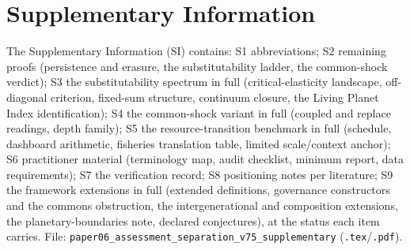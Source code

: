 \section*{Supplementary Information}
The Supplementary Information (SI) contains: S1 abbreviations; S2 remaining proofs (persistence and erasure, the substitutability ladder, the common-shock verdict); S3 the substitutability spectrum in full (critical-elasticity landscape, off-diagonal criterion, fixed-sum structure, continuum closure, the Living Planet Index identification); S4 the common-shock variant in full (coupled and replace readings, depth family); S5 the resource-transition benchmark in full (schedule, dashboard arithmetic, fisheries translation table, limited scale/context anchor); S6 practitioner material (terminology map, audit checklist, minimum report, data requirements); S7 the verification record; S8 positioning notes per literature; S9 the framework extensions in full (extended definitions, governance constructors and the commons obstruction, the intergenerational and composition extensions, the planetary-boundaries note, declared conjectures), at the status each item carries. File: \texttt{paper06\_assessment\_separation\_v75\_supplementary} (\texttt{.tex}/\texttt{.pdf}).

